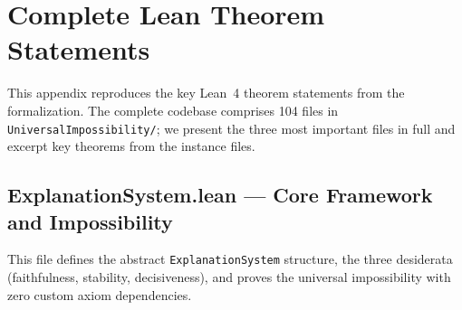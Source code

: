 \documentclass[11pt,a4paper]{article}
\begin{document}
\section{Complete Lean Theorem Statements}
\label{app:lean}

This appendix reproduces the key Lean~4 theorem statements from the
formalization.  The complete codebase comprises 104 files in
\texttt{UniversalImpossibility/}; we present the three most important files
in full and excerpt key theorems from the instance files.

\subsection{ExplanationSystem.lean --- Core Framework and Impossibility}
\label{app:lean-explanation-system}

This file defines the abstract \texttt{ExplanationSystem} structure, the three
desiderata (faithfulness, stability, decisiveness), and proves the universal
impossibility with zero custom axiom dependencies.
\end{document}
